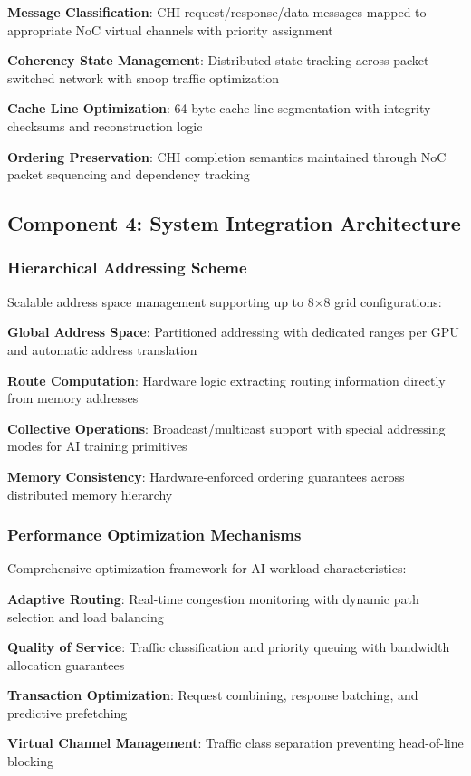 \documentclass[11pt,a4paper]{article}
\begin{document}
\begin{techlist}
    \item \textbf{Message Classification}: CHI request/response/data messages mapped to appropriate NoC virtual channels with priority assignment
    \item \textbf{Coherency State Management}: Distributed state tracking across packet-switched network with snoop traffic optimization
    \item \textbf{Cache Line Optimization}: 64-byte cache line segmentation with integrity checksums and reconstruction logic
    \item \textbf{Ordering Preservation}: CHI completion semantics maintained through NoC packet sequencing and dependency tracking
\end{techlist}

\subsection{Component 4: System Integration Architecture}

\subsubsection{Hierarchical Addressing Scheme}
Scalable address space management supporting up to 8×8 grid configurations:

\begin{techlist}
    \item \textbf{Global Address Space}: Partitioned addressing with dedicated ranges per GPU and automatic address translation
    \item \textbf{Route Computation}: Hardware logic extracting routing information directly from memory addresses
    \item \textbf{Collective Operations}: Broadcast/multicast support with special addressing modes for AI training primitives
    \item \textbf{Memory Consistency}: Hardware-enforced ordering guarantees across distributed memory hierarchy
\end{techlist}

\subsubsection{Performance Optimization Mechanisms}
Comprehensive optimization framework for AI workload characteristics:

\begin{techlist}
    \item \textbf{Adaptive Routing}: Real-time congestion monitoring with dynamic path selection and load balancing
    \item \textbf{Quality of Service}: Traffic classification and priority queuing with bandwidth allocation guarantees
    \item \textbf{Transaction Optimization}: Request combining, response batching, and predictive prefetching
    \item \textbf{Virtual Channel Management}: Traffic class separation preventing head-of-line blocking
\end{techlist}
\end{document}
